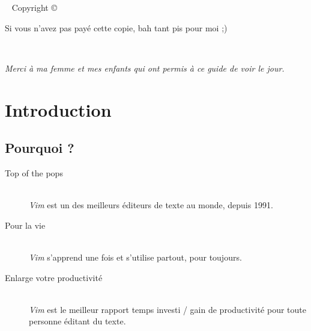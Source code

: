 



\frontmatter

\blankpage

\maketitle


\newpage
\begin{fullwidth}
~\vfill
\thispagestyle{empty}
\setlength{\parindent}{0pt}
\setlength{\parskip}{\baselineskip}
Copyright \copyright\ \the\year\ \thanklessauthor

\par{}

\par{}

\par Si vous n'avez pas payé cette copie, bah tant pis pour moi ;)

\end{fullwidth}

\tableofcontents

\listoffigures

\listoftables

\cleardoublepage
~\vfill
\begin{doublespace}
\noindent\fontsize{18}{22}\selectfont\itshape
\nohyphenation
Merci à ma femme et mes enfants qui ont permis à ce guide de voir le jour.
\end{doublespace}
\vfill
\vfill

\cleardoublepage
\chapter*{Introduction}

\section{Pourquoi ?}

\begin{description}
    \item[Top of the pops] \hfill \\ \emph{Vim} est un des meilleurs éditeurs de texte au monde, depuis 1991.
    \item[Pour la vie] \hfill \\ \emph{Vim} s'apprend une fois et s'utilise partout, pour toujours.
    \item[Enlarge votre productivité] \hfill \\ \emph{Vim} est le meilleur rapport temps investi / gain de productivité pour toute personne éditant du texte.
\end{description}

